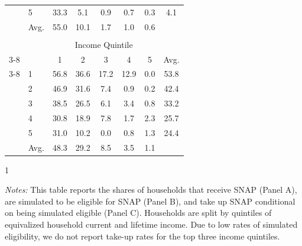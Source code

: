 \begin{table}[t]
\begin{tabular*}{\textwidth}{@{\extracolsep{\fill}}llcccccc@{}}
                                      & 5 & 33.3 & 5.1 & 0.9 & 0.7 & 0.3 & 4.1 \\
                                      & Avg. & 55.0 & 10.1 & 1.7 & 1.0 & 0.6  \\ \midrule \addlinespace
\multicolumn{5}{@{}l}{\emph{Panel C: Take-Up Rate Among Simulated Eligibles}}   \\
                                      &   & \multicolumn{5}{c}{Income Quintile}                                                                    \\ \cmidrule{3-8}
                                      &   & 1                  & 2                  & 3                  & 4                  & 5     & Avg.             \\ \cmidrule{3-8}
\multirow{5}{*}{Lifetime Income Quintile} & 1 & 56.8 & 36.6 & 17.2 & 12.9 & 0.0  & 53.8 \\
                                      & 2 & 46.9 & 31.6 & 7.4 & 0.9 & 0.2 & 42.4  \\
                                      & 3 & 38.5 & 26.5 & 6.1 & 3.4 & 0.8 & 33.2  \\
                                      & 4 & 30.8 & 18.9 & 7.8 & 1.7 & 2.3 & 25.7  \\
                                      & 5 & 31.0 & 10.2 & 0.0 & 0.8 & 1.3 & 24.4  \\ 
                                       & Avg. & 48.3 & 29.2 & 8.5 & 3.5 & 1.1  \\                                      \bottomrule
\end{tabular*}
            \begin{spacing}{1}
\begin{tablenotes}
       \item \footnotesize \textit{Notes:} This table reports the shares of households that receive SNAP (Panel A), are simulated to be eligible for SNAP (Panel B), and take up SNAP conditional on being simulated eligible (Panel C). Households are split by quintiles of equivalized household current and lifetime income.  Due to low rates of simulated eligibility, we do not report take-up rates for the top three income quintiles.
      \end{tablenotes}
       \end{spacing}
\end{table}
    
    
    